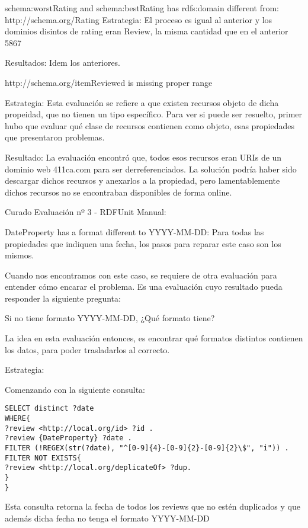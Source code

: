 schema:worstRating and schema:bestRating has rdfs:domain different from: http://schema.org/Rating
Estrategia:
El proceso es igual al anterior y los dominios disintos de rating eran Review, la misma cantidad que en el anterior 5867

Resultados: 
Idem los anteriores.

http://schema.org/itemReviewed is missing proper range

Estrategia:
Esta evaluación se refiere a que existen recursos objeto de dicha propeidad, que no tienen un tipo específico. Para ver si 
puede ser resuelto, primer hubo que evaluar qué clase de recursos contienen como objeto, esas propiedades que presentaron problemas.

Resultado:
La evaluación encontró que, todos esos recursos eran URIs de un dominio web 411ca.com para ser derreferenciados. La solución podría haber sido 
descargar dichos recursos y anexarlos a la propiedad, pero lamentablemente dichos recursos no se encontraban disponibles de forma online.

Curado Evaluación nº 3 - RDFUnit Manual:

{DateProperty} has a format different to YYYY-MM-DD:
Para todas las propiedades que indiquen una fecha, los pasos para reparar este caso son los mismos.

Cuando nos encontramos con este caso, se requiere de otra evaluación para entender cómo encarar el problema. Es una evaluación cuyo resultado
pueda responder la siguiente pregunta:

Si no tiene formato YYYY-MM-DD, ¿Qué formato tiene?

La idea en esta evaluación entonces, es encontrar qué formatos distintos contienen los datos, para poder trasladarlos al correcto.

Estrategia:

Comenzando con la siguiente consulta:


\begin{lstlisting}[frame=single]  
SELECT distinct ?date 
WHERE{
?review <http://local.org/id> ?id .
?review {DateProperty} ?date .
FILTER (!REGEX(str(?date), "^[0-9]{4}-[0-9]{2}-[0-9]{2}\$", "i")) .
FILTER NOT EXISTS{
?review <http://local.org/deplicateOf> ?dup.
}
}
\end{lstlisting}



Esta consulta retorna la fecha de todos los reviews que no estén duplicados y que además dicha fecha no tenga el formato YYYY-MM-DD

